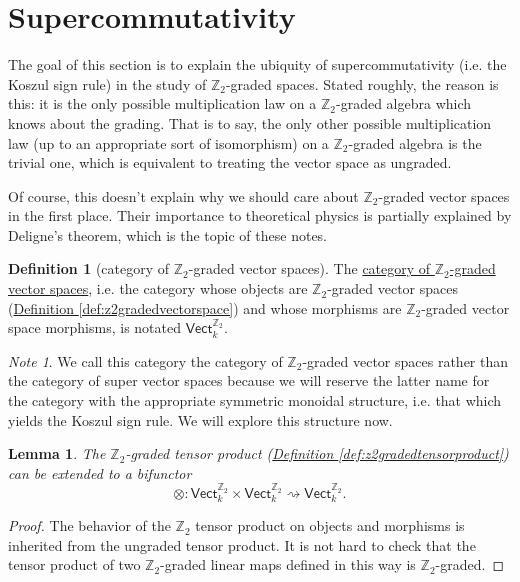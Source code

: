 \documentclass[a4paper]{report}
\newcommand{\Z}{\mathbb{Z}}
\newcommand{\defn}[1]{\ul{#1}}
\theoremstyle{definition}
\newtheorem{definition}{Definition}[section]
\theoremstyle{plain}
\newtheorem{lemma}{Lemma}[section]
\theoremstyle{remark}
\newtheorem{note}{Note}[section]
\begin{document}
\section{Supercommutativity}
The goal of this section is to explain the ubiquity of supercommutativity (i.e. the Koszul sign rule) in the study of $\Z_{2}$-graded spaces. Stated roughly, the reason is this: it is the only possible multiplication law on a $\Z_{2}$-graded algebra which knows about the grading. That is to say, the only other possible multiplication law (up to an appropriate sort of isomorphism) on a $\Z_{2}$-graded algebra is the trivial one, which is equivalent to treating the vector space as ungraded. 

Of course, this doesn't explain why we should care about $\Z_{2}$-graded vector spaces in the first place. Their importance to theoretical physics is partially explained by Deligne's theorem, which is the topic of these notes.

\begin{definition}[category of $\Z_{2}$-graded vector spaces]
  \label{def:categoryofz2gradedvectorspaces}
  The \defn{category of $\Z_{2}$-graded vector spaces}, i.e. the category whose objects are $\Z_{2}$-graded vector spaces (\hyperref[def:z2gradedvectorspace]{Definition \ref*{def:z2gradedvectorspace}}) and whose morphisms are $\Z_{2}$-graded vector space morphisms, is notated $\mathsf{Vect}_{k}^{\Z_{2}}$.
\end{definition}

\begin{note}
  We call this category the category of $\Z_{2}$-graded vector spaces rather than the category of super vector spaces because we will reserve the latter name for the category with the appropriate symmetric monoidal structure, i.e. that which yields the Koszul sign rule. We will explore this structure now.
\end{note}

\begin{lemma}
  The $\Z_{2}$-graded tensor product (\hyperref[def:z2gradedtensorproduct]{Definition \ref*{def:z2gradedtensorproduct}}) can be extended to a bifunctor 
  \begin{equation*}
    \otimes\colon \mathsf{Vect}_k^{\Z_{2}} \times \mathsf{Vect}_k^{\Z_{2}} \rightsquigarrow \mathsf{Vect}_k^{\Z_{2}}.
  \end{equation*}
\end{lemma}
\begin{proof}
  The behavior of the $\Z_{2}$ tensor product on objects and morphisms is inherited from the ungraded tensor product. It is not hard to check that the tensor product of two $\Z_{2}$-graded linear maps defined in this way is $\Z_{2}$-graded.
\end{proof}
\end{document}
